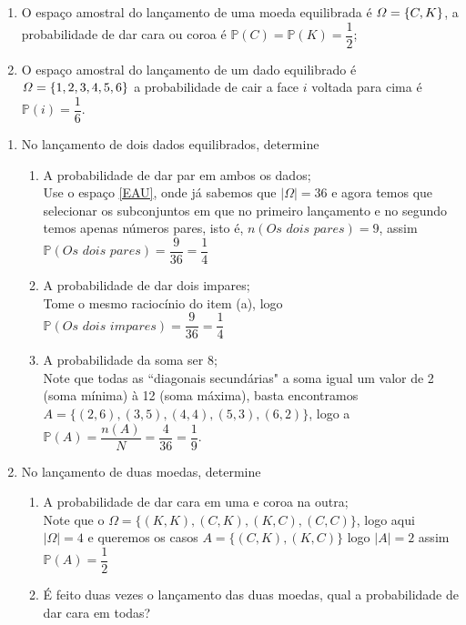 	
	
\exemplo
\begin{enumerate}
	  \item [(i)] O espaço amostral do lançamento de uma moeda equilibrada é $\mathnormal{\Omega} = \{C,K\}$, a probabilidade de dar cara ou coroa é $\mathbb{P}(C) = \mathbb{P}(K)= \dfrac{1}{2}$;
	  \item [(ii)] O espaço amostral do lançamento de um dado equilibrado é $\mathnormal{\Omega} = \{1,2,3,4,5,6\}$ a probabilidade de cair a face $i$ voltada para cima é $\mathbb{P}(i) = \dfrac{1}{6}$.
\end{enumerate}

\exemplo 

\begin{enumerate}
		\item[(i)]No lançamento de dois dados equilibrados, determine
		\begin{enumerate}
			\item[(a)] A probabilidade de dar par em ambos os dados;\\
			Use o espaço \ref{EAU}, onde já sabemos que $|\Omega| = 36$ e agora temos que selecionar os subconjuntos em que no primeiro lançamento e no segundo temos apenas números pares, isto é, $n(Os\,\,dois\,\, pares) = 9$, assim $\mathbb{P}(Os\,\,dois\,\, pares)=\dfrac{9}{36}=\dfrac{1}{4}$
			\item [(b)] A probabilidade de dar dois impares;\\
			\inic Tome o mesmo raciocínio do item (a), logo $\mathbb{P}(Os\,\,dois\,\, impares)=\dfrac{9}{36}=\dfrac{1}{4}$
			\item [(c)] A probabilidade da soma ser 8;\\
			Note que todas as ``diagonais secundárias" a soma igual um valor de 2 (soma mínima) à 12 (soma máxima), basta encontramos $A = \{(2,6), (3,5), (4,4), (5,3), (6,2)\}$, logo a $\mathbb{P}(A) = \dfrac{n(A)}{N}=\dfrac{4}{36} = \dfrac{1}{9}$.
		\end{enumerate}
		\item[(ii)] No lançamento de duas moedas, determine
		\begin{enumerate}
			\item [(a)] A probabilidade de dar cara em uma e coroa na outra;\\
			Note que o $\Omega = \{(K,K), (C,K), (K,C), (C,C)\}$, logo aqui $|\Omega| = 4$ e queremos os casos $A = \{(C,K), (K,C)\}$ logo $|A| = 2$ assim $\mathbb{P}(A) = \dfrac{1}{2}$
			\item [(b)] É feito duas vezes o lançamento das duas moedas, qual a probabilidade de dar cara em todas?

\end{enumerate}
\end{enumerate}

